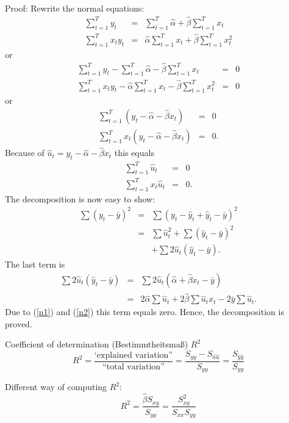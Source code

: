 \documentclass{article}
\begin{document}
Proof: Rewrite the normal equations:
\begin{eqnarray*}
\sum_{t=1}^{T}y_{t} &=&\sum_{t=1}^{T}\hat{\alpha}+\hat{\beta}%
\sum_{t=1}^{T}x_{t} \\
\sum_{t=1}^{T}x_{t}y_{t} &=&\hat{\alpha}\sum_{t=1}^{T}x_{t}+\hat{\beta}%
\sum_{t=1}^{T}x_{t}^{2}
\end{eqnarray*}%
or
\begin{eqnarray*}
\sum_{t=1}^{T}y_{t}-\sum_{t=1}^{T}\hat{\alpha}-\hat{\beta}%
\sum_{t=1}^{T}x_{t} &=&0 \\
\sum_{t=1}^{T}x_{t}y_{t}-\hat{\alpha}\sum_{t=1}^{T}x_{t}-\hat{\beta}%
\sum_{t=1}^{T}x_{t}^{2} &=&0
\end{eqnarray*}%
or
\begin{eqnarray*}
\sum_{t=1}^{T}\left( y_{t}-\hat{\alpha}-\hat{\beta}x_{t}\right) &=&0 \\
\sum_{t=1}^{T}x_{t}\left( y_{t}-\hat{\alpha}-\hat{\beta}x_{t}\right) &=&0.
\end{eqnarray*}
Because of $\hat{u}_{t}=y_{t}-\hat{\alpha}-\hat{\beta}x_{t}$ this equals
\begin{eqnarray}
\sum_{t=1}^{T}\hat{u}_{t} &=&0  \label{n1} \\
\sum_{t=1}^{T}x_{t}\hat{u}_{t} &=&0.  \label{n2}
\end{eqnarray}%
The decomposition is now easy to show:
\begin{eqnarray*}
\sum \left( y_{t}-\bar{y}\right) ^{2} &=&\sum \left( y_{t}-\hat{y}_{t}+\hat{y%
}_{t}-\bar{y}\right) ^{2} \\
&=&\sum \hat{u}_{t}^{2}+\sum \left( \hat{y}_{t}-\bar{y}\right) ^{2} \\
&&+\sum 2\hat{u}_{t}\left( \hat{y}_{t}-\bar{y}\right) .
\end{eqnarray*}%
The last term is
\begin{eqnarray*}
\sum 2\hat{u}_{t}\left( \hat{y}_{t}-\bar{y}\right) &=&\sum 2\hat{u}%
_{t}\left( \hat{\alpha}+\hat{\beta}x_{t}-\bar{y}\right) \\
&=&2\hat{\alpha}\sum \hat{u}_{t}+2\hat{\beta}\sum \hat{u}_{t}x_{t}-2\bar{y}%
\sum \hat{u}_{t}.
\end{eqnarray*}%
Due to (\ref{n1}) and (\ref{n2}) this term equals zero. Hence, the decomposition is proved.

Coefficient of determination (Bestimmtheitsmaß) $R^2$
\[ R^{2}=\frac{\text{`explained variation''}}
{\text{``total variation''}}=\frac{S_{yy}-S_{\hat{u}\hat{u}}}{S_{yy}}=\frac{S_{\hat{y}\hat{y}}}{S_{yy}} \]

Different way of computing $R^{2}$:
\[ R^{2}=\frac{\hat{\beta}S_{xy}}{S_{yy}}=\frac{S_{xy}^{2}}{S_{xx}S_{yy}} \]
\end{document}
